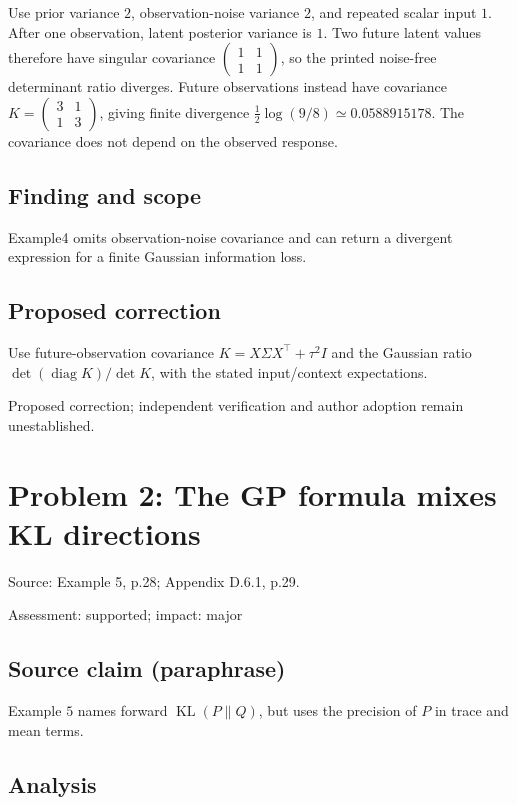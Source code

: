 \documentclass[11pt]{article}
\begin{document}
Use prior variance \(2\), observation-noise variance \(2\), and repeated scalar input \(1\). After one observation, latent posterior variance is \(1\). Two future latent values therefore have singular covariance \(\begin{pmatrix}1&1\\1&1\end{pmatrix}\), so the printed noise-free determinant ratio diverges. Future observations instead have covariance \(K=\begin{pmatrix}3&1\\1&3\end{pmatrix}\), giving finite divergence \(\frac12\log(9/8)\simeq0.0588915178\). The covariance does not depend on the observed response.

\subsection*{Finding and scope}

Example4 omits observation-noise covariance and can return a divergent expression for a finite Gaussian information loss.

\subsection*{Proposed correction}

Use future-observation covariance \(K=X\Sigma X^\top+\tau^2I\) and the Gaussian ratio \(\det(\operatorname{diag}K)/\det K\), with the stated input/context expectations.

Proposed correction; independent verification and author adoption remain unestablished.

\section*{Problem 2: The GP formula mixes KL directions}

Source: Example 5, p.28; Appendix D.6.1, p.29.

Assessment: supported; impact: major

\subsection*{Source claim (paraphrase)}

Example \(5\) names forward \(\operatorname{KL}(P\|Q)\), but uses the precision of \(P\) in trace and mean terms.

\subsection*{Analysis}
\end{document}
